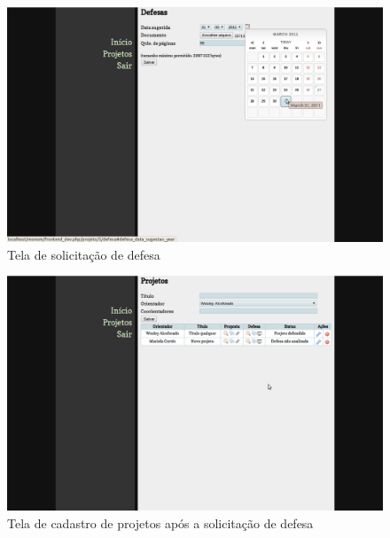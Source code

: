\begin{figure}[htbp]
\centering
\includegraphics[width=1\textwidth]{fig/telas/processo/aluno_07_submetendo_defesa.png}
\caption{Tela de solicitação de defesa}
\label{fig:aluno_07_submetendo_defesa}
\end{figure}

\begin{figure}[htbp]
\centering
\includegraphics[width=1\textwidth]{fig/telas/processo/aluno_08_defesa_nao_analisada.png}
\caption{Tela de cadastro de projetos após a solicitação de defesa}
\label{fig:aluno_08_defesa_nao_analisada}
\end{figure}

